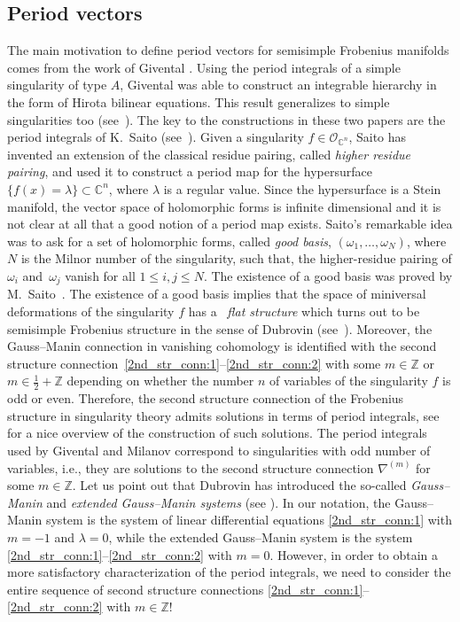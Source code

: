 \documentclass[pdftex]{sigma}
\numberwithin{equation}{section}
\newcommand{\CC}{\mathbb{C}}
\newcommand{\ZZ}{\mathbb{Z}}
\renewcommand{\O}{\mathcal{O}}
\begin{document}
\subsection{Period vectors}
The main motivation to define period vectors for semisimple Frobenius
manifolds comes from the work of Givental \cite{Giv-AnKdV}. Using the period
integrals of a simple singularity of type $A$, Givental was able to
construct an integrable
hierarchy in the form of Hirota bilinear equations. This result generalizes
to simple singularities too (see~\cite{GM2005}). The key to the
constructions in these two papers are the period integrals of
K.~Saito (see~\cite{Saito1983}). Given a singularity $f\in \O_{\CC^n}$, Saito has
invented an extension of the classical residue pairing, called {\em
 higher residue pairing}, and used it to
construct a period map for the hypersurface
$\{f(x)=\lambda\}\subset \CC^n$, where $\lambda$ is a regular value.
Since the hypersurface is a Stein manifold, the vector space of holomorphic forms is
infinite dimensional and it is not clear at all that a
good notion of a period map exists. Saito's remarkable idea was to
ask for a set of holomorphic forms, called {\em good basis},
$(\omega_1,\dots,\omega_N)$, where~$N$ is the Milnor number of the singularity, such that, the
higher-residue pairing of $\omega_i$ and~$\omega_j$ vanish for all $1\leq
i,j\leq N$. The existence of a good basis was proved by M.~Saito~\cite{MSaito1989}. The existence of a good basis implies that the
space of miniversal deformations of the singularity $f$ has a~{\em
 flat structure} which turns out to be semisimple Frobenius
structure in the sense of Dubrovin (see~\cite{hertling_2002}). Moreover, the Gauss--Manin
connection in vanishing cohomology is identified with
the second structure connection~\eqref{2nd_str_conn:1}--\eqref{2nd_str_conn:2} with some $m\in \ZZ$ or
$m\in \tfrac{1}{2}+\ZZ$ depending on whether the number $n$ of variables
of the singularity $f$ is odd or even. Therefore, the second structure
connection of the Frobenius structure in singularity theory admits
solutions in terms of period integrals, see~\cite[Section~3.1]{FGM2010} for a nice overview of the construction of such
solutions. The period integrals used by
Givental and Milanov correspond to singularities with odd number of
variables, i.e., they are solutions to the second structure connection
$\nabla^{(m)}$ for some $m\in \ZZ$. Let us point out that Dubrovin
has introduced the so-called {\em Gauss--Manin} and {\em
extended Gauss--Manin systems} (see \cite[equations~(5.9), (5.11) and (5.12)]{Dubrovin1999}). In our notation, the Gauss--Manin system
 is the system of linear differential equations \eqref{2nd_str_conn:1} with $m=-1$
 and $\lambda=0$, while the extended Gauss--Manin system is the system
\eqref{2nd_str_conn:1}--\eqref{2nd_str_conn:2} with $m=0$. However,
in order to obtain a more satisfactory characterization of the period
integrals, we need to
consider the entire sequence of second structure connections
\eqref{2nd_str_conn:1}--\eqref{2nd_str_conn:2} with $m\in \ZZ$!
\end{document}
